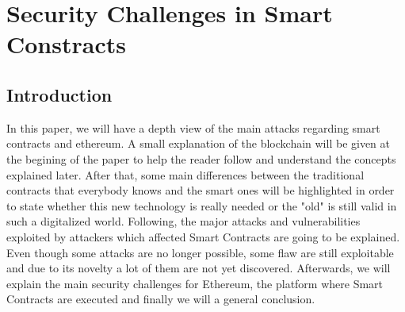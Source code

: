 \chapter{Security Challenges in Smart Constracts}


\newpage

\minitoc %

\newpage


\section{Introduction}
In this paper, we will have a depth view of the main attacks regarding smart contracts and ethereum.
A small explanation of the blockchain will be given at the begining of the paper  to help the reader follow and understand the concepts explained later.
After that, some main differences between the traditional contracts that everybody knows and the smart ones will be highlighted in order to state whether this new technology is really needed or the "old" is still valid in such a digitalized world.
Following, the major attacks and vulnerabilities exploited by attackers which affected Smart Contracts are going to be explained. Even though some attacks are no longer possible, some flaw are still exploitable and due to its novelty a lot of them are not yet discovered. 
Afterwards, we will explain the main security challenges for Ethereum, the platform where Smart Contracts are executed and finally we will a general conclusion.

